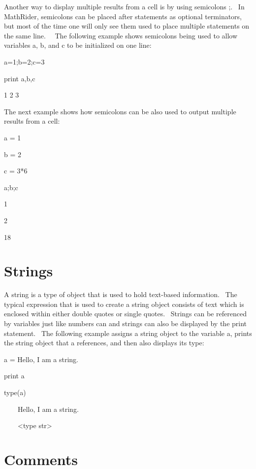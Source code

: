 \documentclass[12pt,twoside]{book}
\begin{document}
\bigskip

Another way to display multiple results from a cell is by using semicolons {\textquotesingle};{\textquotesingle}. \ In MathRider, semicolons can be placed after statements as optional terminators, but most of the time one will only see them used to place multiple statements on the same line. \ \ The following example shows semicolons being used to allow variables a, b, and c to be initialized on one line:


\bigskip

a=1;b=2;c=3

print a,b,c

{\textbar}

1 2 3

The next example shows how semicolons can be also used to output multiple results from a cell: 

\bigskip

a = 1

b = 2

c = 3*6

a;b;c

{\textbar}

1

2

18

\section[Strings]{Strings}
A string is a type of object that is used to hold text{}-based information. \ The typical expression that is used to create a string object consists of text which is enclosed within either double quotes or single quotes. \ Strings can be referenced by variables just like numbers can and strings can also be displayed by the print statement. \ The following example assigns a string object to the variable {\textquotesingle}a{\textquotesingle}, prints the string object that {\textquotesingle}a{\textquotesingle} references, and then also displays its type: 

\bigskip

a = {\textquotedbl}Hello, I am a string.{\textquotedbl}

print a

type(a)

{\textbar}

\ \ \ \ Hello, I am a string.

\ \ \ \ {\textless}type
{\textquotesingle}str{\textquotesingle}{\textgreater}

\section[Comments]{Comments}
\end{document}
